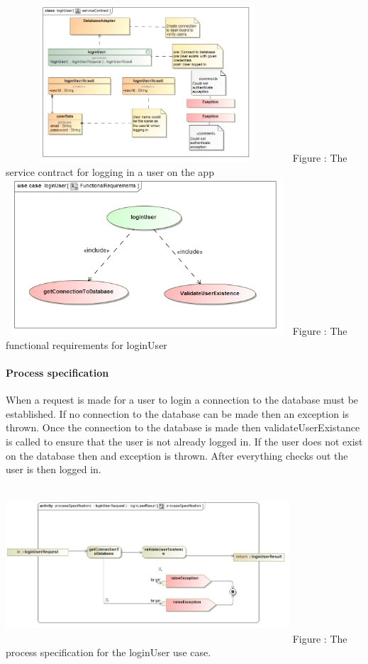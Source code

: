 \documentclass[hidelinks, 12pt, oneside]{article}
\begin{document}
\includegraphics[width=400px,height=220px]{img/serviceContractLoginUser.jpg}
		Figure : The service contract for logging in a user on the app\newline
\includegraphics[width=400px,height=220px]{img/functionalRequirementsLoginUser.jpg}
		Figure : The functional requirements for loginUser\newline		
				
		\paragraph{Process specification}
		When a request is made for a user to login a connection to the database must be established. If no connection to the database can be made then an exception is thrown. Once the connection to the database is made then validateUserExistance is called to ensure that the user is not already logged in. If the user does not exist on the database then and exception is thrown. After everything checks out the user is then logged in.\newline\newline			
		
		\includegraphics[width=400px,height=220px]{img/processSpecificationLoginUser.jpg}
		Figure : The process specification for the loginUser use case.	
\end{document}
